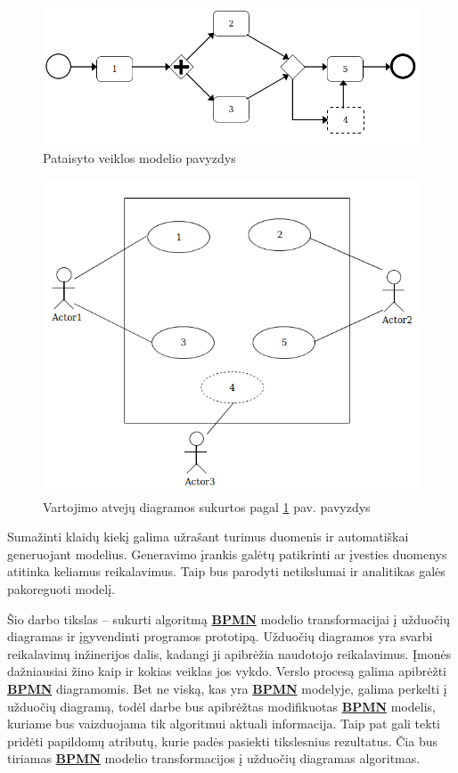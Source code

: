 \documentclass{VUMIFInfBakalaurinis}
\newcommand{\bhyperref}[2]{\hyperref[#1]{\textbf{#2}}}
\newcommand{\BPMN}{\bhyperref{section:bpmn}{BPMN}}
\begin{document}
\begin{figure}[H]
	\centering
	\includegraphics[width=\textwidth]{img/bad_modeling/corrected_model}
	\caption{Pataisyto veiklos modelio pavyzdys}
	\label{img:corrected_model}
\end{figure}
\begin{figure}[H]
	\centering
	\includegraphics[width=15cm]{img/bad_modeling/corrected_model_use_cases}
	\caption{Vartojimo atvejų diagramos sukurtos pagal \ref{img:corrected_model} pav. pavyzdys}
	\label{img:corrected_model_use_cases}
\end{figure}

Sumažinti klaidų kiekį galima užrašant turimus duomenis ir automatiškai generuojant modelius. Generavimo įrankis galėtų patikrinti ar įvesties duomenys atitinka keliamus reikalavimus. Taip bus parodyti netikslumai ir analitikas galės pakoreguoti modelį.

Šio darbo tikslas – sukurti algoritmą \BPMN{} modelio transformacijai į užduočių diagramas ir įgyvendinti programos prototipą. Užduočių diagramos yra svarbi reikalavimų inžinerijos dalis, kadangi ji apibrėžia naudotojo reikalavimus. Įmonės dažniausiai žino kaip ir kokias veiklas jos vykdo. Verslo procesą galima apibrėžti \BPMN{} diagramomis. Bet ne viską, kas yra \BPMN{} modelyje, galima perkelti į užduočių diagramą, todėl darbe bus apibrėžtas modifikuotas \BPMN{} modelis, kuriame bus vaizduojama tik algoritmui aktuali informacija. Taip pat gali tekti pridėti papildomų atributų, kurie padės pasiekti tikslesnius rezultatus. Čia bus tiriamas \BPMN{} modelio transformacijos į užduočių diagramas algoritmas.
\end{document}
